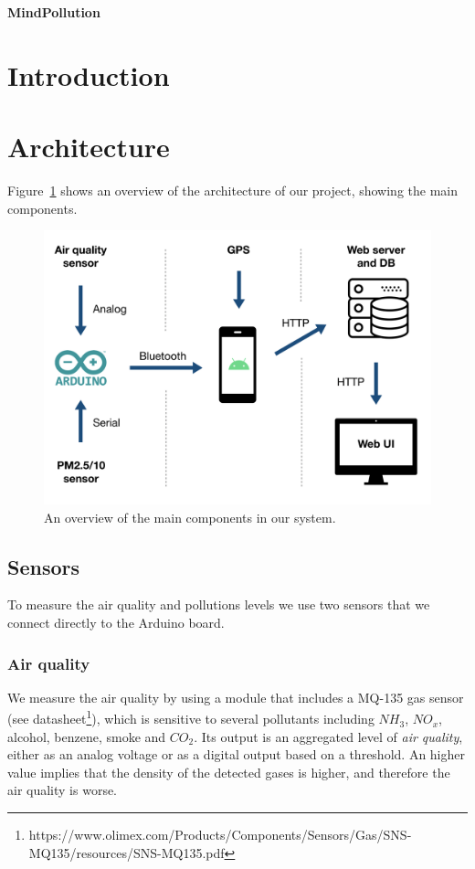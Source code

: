 \documentclass[12pt]{article}
\begin{document}
  \begin{center}
    \LARGE{\textbf{MindPollution}}
  \end{center}
  \section{Introduction}
  \newpage
  \section{Architecture}

  Figure~\ref{fig:architecture} shows an overview of the architecture of our project, showing the main components.
  \begin{figure}[ht]
    \centering
    \includegraphics[width=\textwidth]{images/architecture.png}
    \caption{An overview of the main components in our system.}
    \label{fig:architecture}
  \end{figure}
  \subsection{Sensors}
  To measure the air quality and pollutions levels we use two sensors that we connect directly to the Arduino board.
  \subsubsection{Air quality}
  We measure the air quality by using a module that includes a MQ-135 gas sensor (see datasheet\footnote{https://www.olimex.com/Products/Components/Sensors/Gas/SNS-MQ135/resources/SNS-MQ135.pdf}), which is sensitive to several pollutants including $NH_3$, $NO_x$, alcohol, benzene, smoke and $CO_2$.
  Its output is an aggregated level of \textit{air quality}, either as an analog voltage or as a digital output based on a threshold. An higher value implies that the density of the detected gases is higher, and therefore the air quality is worse.
\end{document}
